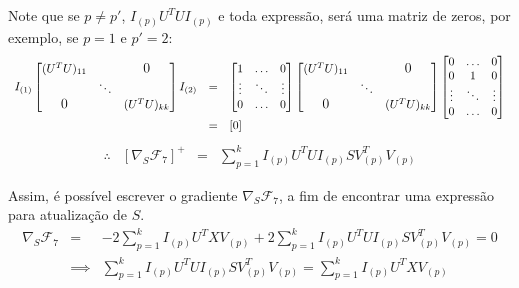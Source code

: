 \documentclass[
    12pt,                %
    oneside,            %
    a4paper,            %
    english,            %
    brazil                %
    ]{abntex2ppgsi}
\begin{document}
Note que se $p \neq p'$, $I_{(p)} U^T U I_{(p)}$ e toda expressão, será uma matriz de zeros, por exemplo, se $p=1$ e $p'=2$:
\[
\begin{array}{lcl}
    I_{(1)}
    \begin{bmatrix}
        (U^T U)_{11}            &        & \smash{\text{\large 0}} \\
                                & \ddots &                         \\
        \smash{\text{\large 0}} &        & (U^T U)_{kk}
    \end{bmatrix}
    I_{(2)}
    & = & \begin{bmatrix}
          1      & \hdots & 0      \\
          \vdots & \ddots & \vdots \\
          0      & \hdots & 0
      \end{bmatrix}
      \begin{bmatrix}
          (U^T U)_{11}            &        & \smash{\text{\large 0}} \\
                                  & \ddots &                         \\
          \smash{\text{\large 0}} &        & (U^T U)_{kk}
      \end{bmatrix}
      \begin{bmatrix}
          0      & \hdots & 0      \\
          0      &    1   & 0      \\
          \vdots & \ddots & \vdots \\
          0      & \hdots & 0
      \end{bmatrix} \\
      & = & [0]
\end{array}
\]
\[
    \begin{array}{lclcl}
        \therefore & [\nabla_S \mathcal{F}_7]^+ & = & \sum_{p=1}^{k} I_{(p)} U^T U I_{(p)} S V_{(p)}^T V_{(p)}
    \end{array}
\]

Assim, é possível escrever o gradiente $\nabla_S \mathcal{F}_7$, a fim de encontrar uma expressão para atualização de $S$.
\[
    \begin{array}{lcl}
        \nabla_S \mathcal{F}_7     &     =    & - 2 \sum_{p=1}^{k} I_{(p)} U^T X V_{(p)} + 2 \sum_{p=1}^{k} I_{(p)} U^T U I_{(p)} S V_{(p)}^T V_{(p)} = 0 \\
                                   & \implies & \sum_{p=1}^{k} I_{(p)} U^T U I_{(p)} S V_{(p)}^T V_{(p)} = \sum_{p=1}^{k} I_{(p)} U^T X V_{(p)}
    \end{array}   \nonumber
\]
\end{document}

